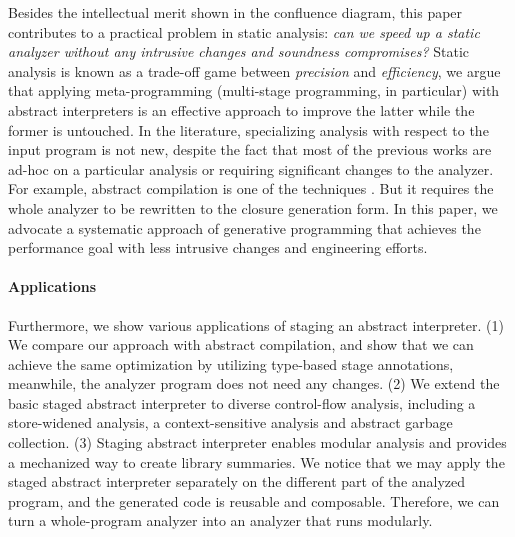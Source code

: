 Besides the intellectual merit shown in the confluence diagram, this paper
contributes to a practical problem in static analysis: \textit{can we speed up a
static analyzer without any intrusive changes and soundness compromises?} Static
analysis is known as a trade-off game between \textit{precision} and
\textit{efficiency}, we argue that applying meta-programming (multi-stage
programming, in particular) with abstract interpreters is an effective approach
to improve the latter while the former is untouched.
In the literature, specializing analysis with respect to the input program
\cite{damian1999partial, amtoft1999partial, Boucher:1996:ACN:647473.727587,
ashley:practical} is not new, despite the fact that most of the previous works
are ad-hoc on a particular analysis or requiring significant changes to the
analyzer. For example, abstract compilation is one of the techniques
\cite{Boucher:1996:ACN:647473.727587}. But it requires the whole analyzer to be
rewritten to the closure generation form. In this paper, we advocate a systematic
approach of generative programming that achieves the performance goal with less
intrusive changes and engineering efforts.

\paragraph{Applications}

Furthermore, we show various applications of staging an abstract interpreter.
(1) We compare our approach with abstract compilation, and show that we can
achieve the same optimization by utilizing type-based stage annotations,
meanwhile, the analyzer program does not need any changes. (2) We extend the 
basic staged abstract interpreter to diverse control-flow analysis, 
including a store-widened analysis, a context-sensitive analysis and abstract garbage collection.
(3) Staging abstract interpreter enables modular analysis and provides a mechanized
way to create library summaries. We notice that we may apply the staged abstract
interpreter separately on the different part of the analyzed program, and the
generated code is reusable and composable. Therefore, we can turn a
whole-program analyzer into an analyzer that runs modularly.

